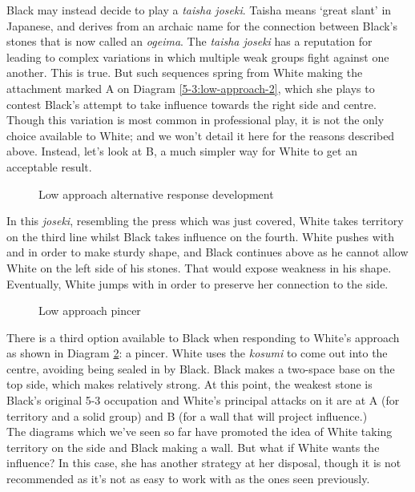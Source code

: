 \documentclass[a5paper,12pt,twoside]{book} %
\newcounter{joseki}                 %
\newcommand{\dref}[1]{Diagram \ref{#1}}
\newcommand{\addstufftotoc}[2][toc]{%
  \addtocontents{#1}{#2}}
\begin{document}
Black may instead decide to play a \textit{taisha joseki}. Taisha means `great slant' in Japanese, and derives from an archaic name for the connection between Black's stones that is now called an \textit{ogeima}. The \textit{taisha joseki} has a reputation for leading to complex variations in which multiple weak groups fight against one another. This is true. But such sequences spring from White making the attachment marked A on \dref{5-3:low-approach-2}, which she plays to contest Black's attempt to take influence towards the right side and centre. Though this variation is most common in professional play, it is not the only choice available to White; and we won't detail it here for the reasons described above. Instead, let's look at B, a much simpler way for White to get an acceptable result.\\

\begin{figure}[!htbp]
 
\vspace{-0.6cm}\caption{Low approach alternative response development}
\label{5-3:low-approach-2-dev}
\end{figure}

In this \textit{joseki}, resembling the press which was just covered, White takes territory on the third line whilst Black takes influence on the fourth. White pushes with{\large\whitestone[7]} and{\large\whitestone[9]} in order to make sturdy shape, and Black continues above as he cannot allow White on the left side of his stones. That would expose weakness in his shape. Eventually, White jumps with{\large\whitestone[11]} in order to preserve her connection to the side.\\

\addstufftotoc{\nobreak\smallskip\protect\par}

\begin{figure}[!htbp]
 
\vspace{-0.6cm}\caption{Low approach pincer}
\label{5-3:low-approach-pincer}
\end{figure}

There is a third option available to Black when responding to White's approach as shown in \dref{5-3:low-approach-pincer}: a pincer. White uses the \textit{kosumi}{\large\whitestone[3]} to come out into the centre, avoiding being sealed in by Black. Black makes a two-space base on the top side, which makes{\large\blackstone[2]} relatively strong. At this point, the weakest stone is Black's original 5-3 occupation and White's principal attacks on it are at A (for territory and a solid group) and B (for a wall that will project influence.)\\
The diagrams which we've seen so far have promoted the idea of White taking territory on the side and Black making a wall. But what if White wants the influence? In this case, she has another strategy at her disposal, though it is not recommended as it's not as easy to work with as the ones seen previously.\\
\end{document}
